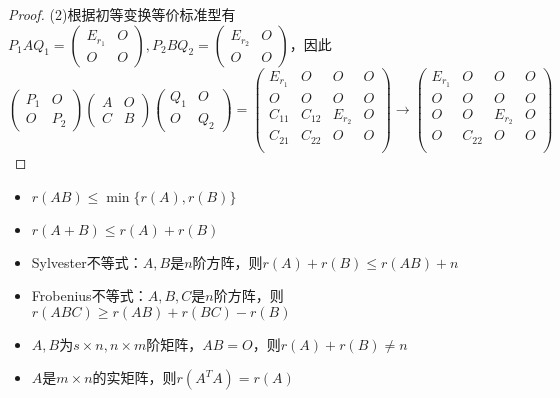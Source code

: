 \begin{proof}
  (2)根据初等变换等价标准型有$P_1AQ_1 = \left(
    \begin{array}{cc}
      E_{r_1}&O\\
      O&O
    \end{array}
  \right), P_2BQ_2 = \left(
    \begin{array}{cc}
      E_{r_2}&O\\
      O&O
    \end{array}
  \right)$，因此
  \begin{equation*}
    \left(
      \begin{array}{cc}
        P_1&O\\
        O&P_2
      \end{array}
    \right) \left(
      \begin{array}{cc}
        A&O\\
        C&B
      \end{array}
    \right)\left(
      \begin{array}{cc}
        Q_1&O\\
        O&Q_2
      \end{array}
    \right) =
    \left(
      \begin{array}{cccc}
        E_{r_1}&O&O&O\\
        O&O&O&O\\
        C_{11}&C_{12}&E_{r_2}&O\\
        C_{21}&C_{22}&O&O\\
      \end{array}
    \right)
    \rightarrow 
    \left(
      \begin{array}{cccc}
        E_{r_1}&O&O&O\\
        O&O&O&O\\
        O&O&E_{r_2}&O\\
        O&C_{22}&O&O\\
      \end{array}
    \right)
  \end{equation*}
\end{proof}

\begin{theorem}[矩阵秩基本不等式]
  \begin{itemize}
  \item $r(AB) \leq \min\{r(A),r(B)\}$
  \item $r(A + B) \leq r(A) + r(B)$
  \item Sylvester不等式：$A,B$是$n$阶方阵，则$r(A) + r(B) \leq r(AB) + n $
  \item Frobenius不等式：$A,B,C$是$n$阶方阵，则$r(ABC) \geq r(AB) + r(BC) - r(B)$
  \item $A,B$为$s \times n, n\times m$阶矩阵，$AB = O$，则$r(A) + r(B) \neq n$
  \item $A$是$m \times n$的实矩阵，则$r(A^TA) = r(A)$
  \end{itemize}
\end{theorem}

